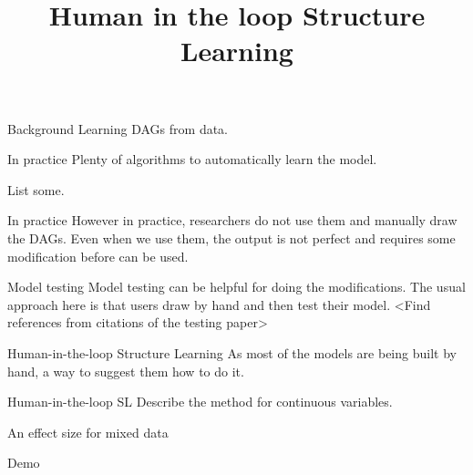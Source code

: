 \documentclass{beamer}
\begin{document}
\title[]{Human in the loop Structure Learning}
\date{}

\maketitle

\begin{frame}{Background}
	Learning DAGs from data.
\end{frame}

\begin{frame}{In practice}
	Plenty of algorithms to automatically learn the model.

	List some.
\end{frame}

\begin{frame}{In practice}
	However in practice, researchers do not use them and manually draw the DAGs.
	Even when we use them, the output is not perfect and requires some modification 
		before can be used.
\end{frame}

\begin{frame}{Model testing}
	Model testing can be helpful for doing the modifications.
	The usual approach here is that users draw by hand and then test their model. <Find references from citations of the testing paper>
\end{frame}

\begin{frame}{Human-in-the-loop Structure Learning}
	As most of the models are being built by hand, a way to suggest them how to do it.
\end{frame}

\begin{frame}{Human-in-the-loop SL}
	Describe the method for continuous variables.
\end{frame}

\begin{frame}{An effect size for mixed data}
\end{frame}

\begin{frame}{Demo}
\end{frame}
\end{document}
